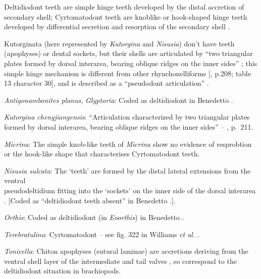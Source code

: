 \documentclass[openany]{book}
\begin{document}
Deltidiodont teeth are simple hinge teeth developed by the distal
accretion of secondary shell; Cyrtomatodont teeth are knoblike or
hook-shaped hinge teeth developed by differential secretion and
resorption of the secondary shell \citep[fig. 322
in][]{Williams1997Introduction}.

Kutorginata (here represented by \emph{Kutorgina} and \emph{Nisusia})
don't have teeth (apophyses) or dental sockets, but their shells are
articulated by ``two triangular plates formed by dorsal interarea,
bearing oblique ridges on the inner sides''
\citep[p.~211]{Williams2000LinguliformeaCraniiformea}; this simple hinge
mechanism is different from other rhynchonelliforms
{[}\citet{Williams2000LinguliformeaCraniiformea}, p.208; table 13
character 30{]}, and is described as a ``pseudodont articulation''
\citep{Holmer2018Evolutionarysignificance}.

\hypertarget{Antigonambonites_planus-coding-78}{}
\emph{Antigonambonites planus}, \emph{Glyptoria}: Coded as deltidiodont
in Benedetto \citeyearpar{Benedetto2009iChaniella}.

\hypertarget{Kutorgina_chengjiangensis-coding-78}{}
\emph{Kutorgina chengjiangensis}: ``Articulation characterized by two
triangular plates formed by dorsal interarea, bearing oblique ridges on
the inner sides'' -- \citet{Williams2000LinguliformeaCraniiformea},
p.~211.

\hypertarget{Micrina-coding-78}{}
\emph{Micrina}: The simple knob-like teeth of \emph{Micrina} show no
evidence of resprobtion or the hook-like shape that characterises
Cyrtomatodont teeth.

\hypertarget{Nisusia_sulcata-coding-78}{}
\emph{Nisusia sulcata}: The `teeth' are formed by the distal lateral
extensions from the ventral\\
pseudodeltidium fitting into the `sockets' on the inner side of the
dorsal interarea \citep{Holmer2018Evolutionarysignificance}. {[}Coded as
``deltidiodont teeth absent'' in Benedetto
\citeyearpar{Benedetto2009iChaniella}.{]}.

\hypertarget{Orthis-coding-78}{}
\emph{Orthis}: Coded as deltidiodont (in \emph{Eoorthis}) in Benedetto
\citeyearpar{Benedetto2009iChaniella}.

\hypertarget{Terebratulina-coding-78}{}
\emph{Terebratulina}: Cyrtomatodont -- see fig. 322 in Williams \emph{et
al}. \citeyearpar{Williams2000LinguliformeaCraniiformea}.

\hypertarget{Tonicella-coding-78}{}
\emph{Tonicella}: Chiton apophyses (sutural laminae) are accretions
deriving from the ventral shell layer of the intermediate and tail
valves \citep{Schwabe2010}, so correspond to the deltidiodont situation
in brachiopods.
\end{document}
